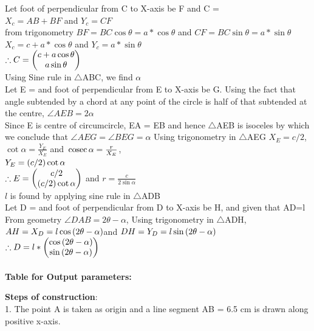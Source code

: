 \documentclass[journal,12pt,twocolumn]{IEEEtran}
\renewcommand\thesection{\arabic{section}}
\begin{document}
\begin{enumerate}[label=\thesection.\arabic*.,ref=\thesection.\theenumi]
Let foot of perpendicular from C to X-axis be F and C = \\
$X_c=AB+BF$ and $Y_c = CF$\\
from trigonometry $BF = BC\cos \theta = a*\cos \theta$ and $CF = BC\sin \theta = a*\sin \theta$ \\
$X_c = c + a*\cos \theta$ and $Y_c = a*\sin \theta$ \\ 
$\therefore C = \begin{pmatrix}c + a\cos \theta \\ a\sin \theta\end{pmatrix} $\\
Using Sine rule in $\bigtriangleup$ABC, we find $\alpha$\\
Let E =  and foot of perpendicular from E to X-axis be G.
Using the fact that angle subtended by a chord at any point of the circle is half of that subtended at the centre,
$\angle AEB = 2\alpha$ \\
Since E is centre of circumcircle, EA = EB and hence $\bigtriangleup$AEB is isoceles by which we conclude that $\angle AEG = \angle BEG = \alpha$
Using trigonometry in $\bigtriangleup$AEG
$X_E=c/2$, $\cot \alpha = \frac{Y_E}{X_E}$ and $\,\text{cosec}\, \alpha = \frac{r}{X_E}$, \\
$Y_E=\left(c/2\right)\cot \alpha $\\ 
$\therefore E = \begin{pmatrix}c/2 \\ \left(c/2\right)\cot \alpha\end{pmatrix} $ and $r=\frac{c}{2\sin \alpha} $\\
$l$ is found by applying sine rule in $\bigtriangleup$ADB\\
Let D =  and foot of perpendicular from D to X-axis be H,
and given that AD=l\\
From geometry $\angle DAB = 2\theta-\alpha$,
Using trigonometry in $\bigtriangleup$ADH, 
$AH=X_D=l\cos \left(2\theta-\alpha\right)$and $DH=Y_D=l\sin \left(2\theta-\alpha\right)$
$\therefore D = l*\begin{pmatrix}\cos \left(2\theta-\alpha\right) \\ \sin \left(2\theta-\alpha\right)\end{pmatrix} $\\
\\
\textbf{Table for Output parameters:}
\begin{table}[h]
\centering
\caption{}
 	
\end{table}

\textbf{Steps of construction}:\\

1. The point A is taken as origin and a line segment AB = 6.5 cm is drawn along positive x-axis.\\


\end{enumerate}
\end{document}
